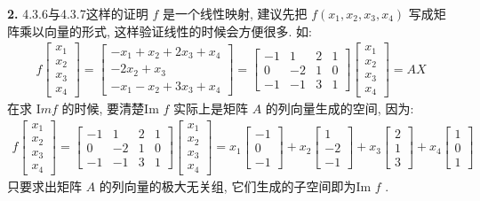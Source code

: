\documentclass[11pt,a4paper,openany,oneside]{book}
\newcommand{\Image}{\mathrm Im}
\begin{document}
\textbf{2.} 4.3.6与4.3.7这样的证明 $ f $ 是一个线性映射, 建议先把 $ f(x_1, x_2, x_3, x_4) $ 写成矩阵乘以向量的形式, 这样验证线性的时候会方便很多. 如:
\begin{gather*}
f
\begin{bmatrix}
x_1 \\ x_2 \\ x_3 \\ x_4
\end{bmatrix}
=
\begin{bmatrix}
-x_1 + x_2 + 2x_3 + x_4 \\ 
-2x_2 + x_3 \\
-x_1 -x_2 + 3x_3 + x_4
\end{bmatrix}
=
\begin{bmatrix}
-1 & 1 & 2 & 1 \\
0  & -2 & 1 & 0 \\
-1 & -1 & 3 & 1 
\end{bmatrix}
\begin{bmatrix}
x_1 \\ x_2 \\ x_3 \\ x_4
\end{bmatrix}
=AX
\end{gather*}
在求 $\Image f $ 的时候, 要清楚Im $ f $ 实际上是矩阵 $ A $ 的列向量生成的空间, 因为:
\begin{gather*}
f
\begin{bmatrix}
x_1  \\  x_2  \\  x_3  \\ x_4
\end{bmatrix}=
\begin{bmatrix}
-1 & 1 & 2 & 1 \\
0  & -2 & 1 & 0 \\
-1 & -1 & 3 & 1 
\end{bmatrix}
\begin{bmatrix}
x_1  \\  x_2  \\  x_3  \\ x_4
\end{bmatrix}=x_1
\begin{bmatrix}
-1  \\  0  \\ -1  
\end{bmatrix}+x_2
\begin{bmatrix}
1  \\  -2  \\  -1 
\end{bmatrix}+x_3 
\begin{bmatrix}
2  \\  1  \\  3  
\end{bmatrix}+x_4
\begin{bmatrix}
1  \\  0  \\  1
\end{bmatrix}
\end{gather*}
只要求出矩阵 $ A $ 的列向量的极大无关组, 它们生成的子空间即为Im $ f $ .
\end{document}
